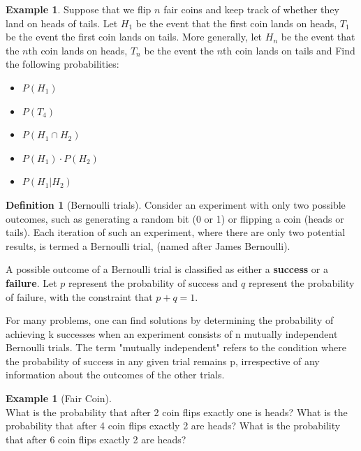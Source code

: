 \documentclass[letterpaper,10pt]{article}
\theoremstyle{plain}
\theoremstyle{definition}
\newtheorem{defn}[thm]{Definition}
\newtheorem{exmp}[thm]{Example}
\theoremstyle{remark}
\begin{document}
\begin{exmp} Suppose that we flip $n$ fair coins and keep track of whether they land on heads of tails. 
Let $H_1$ be the event that the first coin lands on heads, $T_1$ be the event the first coin lands on tails. More generally, let $H_n$ be the event that the $n$th coin lands on heads, $T_n$ be the event the $n$th coin lands on tails and 
\newline
Find the following probabilities:
\begin{itemize}
\item $P(H_1)$
\vspace{1cm}
\item $P(T_4)$
\vspace{1cm}
\item $P(H_1\cap H_2)$
\vspace{1cm}
\item $P(H_1)\cdot P(H_2)$
\vspace{1cm}
\item $P(H_1|H_2)$
\vspace{1cm}
\end{itemize}


\end{exmp}
\begin{defn}[Bernoulli trials]
Consider an experiment with only two possible outcomes, such as generating a random bit (0 or 1) or flipping a coin (heads or tails). Each iteration of such an experiment, where there are only two potential results, is termed a Bernoulli trial, (named after James Bernoulli).

A possible outcome of a Bernoulli trial is classified as either a \textbf{success} or a \textbf{failure}. Let $p$ represent the probability of success and $q$ represent the probability of failure, with the constraint that $p + q = 1$.

For many problems, one can find solutions by determining the probability of achieving k successes when an experiment consists of n mutually independent Bernoulli trials. The term "mutually independent" refers to the condition where the probability of success in any given trial remains p, irrespective of any information about the outcomes of the other trials.
\end{defn}
\begin{exmp}[Fair Coin]$ $\\
What is the probability that after 2 coin flips exactly one is heads?
\newline
\vspace{1cm}
\newline
What is the probability that after 4 coin flips exactly 2 are heads?
\newline
\vspace{1cm}
\newline
What is the probability that after 6 coin flips exactly 2 are heads?
\newline
\vspace{1cm}

\end{exmp}
\end{document}
